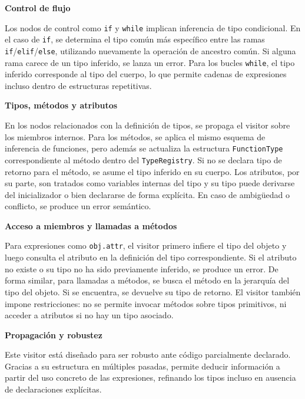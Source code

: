 \documentclass{llncs}
\begin{document}
	\vspace{1em}
	\noindent \textbf{Control de flujo}

	Los nodos de control como \texttt{if} y \texttt{while} implican inferencia de tipo condicional. En el caso de \texttt{if}, se determina el tipo común más específico entre las ramas \texttt{if}/\texttt{elif}/\texttt{else}, utilizando nuevamente la operación de ancestro común. Si alguna rama carece de un tipo inferido, se lanza un error. Para los bucles \texttt{while}, el tipo inferido corresponde al tipo del cuerpo, lo que permite cadenas de expresiones incluso dentro de estructuras repetitivas.

	\vspace{1em}
	\noindent \textbf{Tipos, métodos y atributos}

	En los nodos relacionados con la definición de tipos, se propaga el visitor sobre los miembros internos. Para los métodos, se aplica el mismo esquema de inferencia de funciones, pero además se actualiza la estructura \texttt{FunctionType} correspondiente al método dentro del \texttt{TypeRegistry}. Si no se declara tipo de retorno para el método, se asume el tipo inferido en su cuerpo. Los atributos, por su parte, son tratados como variables internas del tipo y su tipo puede derivarse del inicializador o bien declararse de forma explícita. En caso de ambigüedad o conflicto, se produce un error semántico.

	\vspace{1em}
	\noindent \textbf{Acceso a miembros y llamadas a métodos}

	Para expresiones como \texttt{obj.attr}, el visitor primero infiere el tipo del objeto y luego consulta el atributo en la definición del tipo correspondiente. Si el atributo no existe o su tipo no ha sido previamente inferido, se produce un error. De forma similar, para llamadas a métodos, se busca el método en la jerarquía del tipo del objeto. Si se encuentra, se devuelve su tipo de retorno. El visitor también impone restricciones: no se permite invocar métodos sobre tipos primitivos, ni acceder a atributos si no hay un tipo asociado.

	\vspace{1em}
	\noindent \textbf{Propagación y robustez}

	Este visitor está diseñado para ser robusto ante código parcialmente declarado. Gracias a su estructura en múltiples pasadas, permite deducir información a partir del uso concreto de las expresiones, refinando los tipos incluso en ausencia de declaraciones explícitas.
\end{document}
